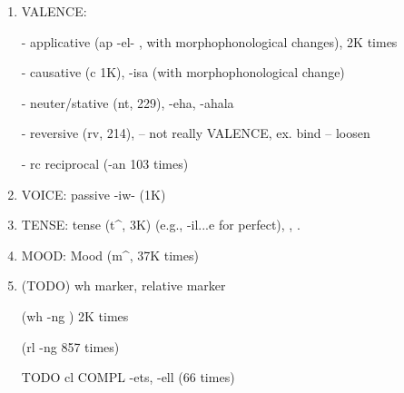 \begin{enumerate}
    \item VALENCE:
    
    - applicative
    (ap -el- \cite[]{doke1967textbook} \cite[p. 109]{lombard1969handbook}, with morphophonological changes), 2K times
    
    - causative (c 1K), -isa (with morphophonological change) \cite[]{doke1967textbook}
    
    - neuter/stative (nt, 229), -eha, -ahala \cite[]{doke1967textbook}
    
    - reversive (rv, 214),  \cite[]{doke1967textbook} -- not really VALENCE, ex. bind -- loosen
    
    - rc reciprocal (-an 103 times)  \cite[]{doke1967textbook}
    
    \item VOICE: passive -iw- (1K)
    
    \cite[]{doke1967textbook} \cite[p. 114]{lombard1969handbook}
    
    \item TENSE: tense (t\^{}, 3K) (e.g., -il...e for perfect), \cite[p. 167]{guma1971outline}, \cite[p. 116]{lombard1969handbook}.
    \item MOOD: Mood (m\^{}, 37K times)
    \item (TODO) wh marker, relative marker
    
    (wh -ng \cite[p. 168]{guma1971handbook}) 2K times
    
    (rl -ng 857 times)
    
    TODO cl COMPL -ets, -ell (66 times)
    
    
    
\end{enumerate}




